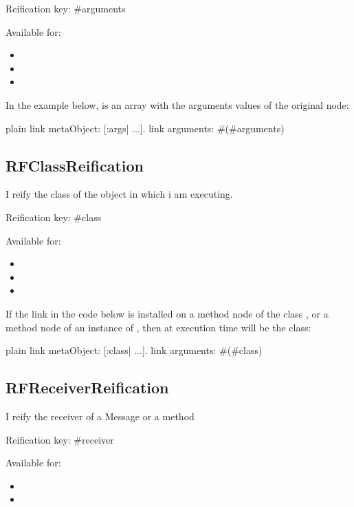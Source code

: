 \documentclass[10pt,twoside,english]{_support/latex/sbabook/sbabook}
\begin{document}
Reification key: \#arguments

Available for:

\begin{itemize}
\item {}
\item {}
\item {}
\end{itemize}

In the example below,  is an array with the arguments values of the original node:

\begin{displaycode}{plain}
link metaObject: [:args| ...].
link arguments: #(#arguments)
\end{displaycode}
\subsection{RFClassReification}
I reify the class of the object in which i am executing.

Reification key: \#class

Available for:

\begin{itemize}
\item {}
\item {}
\item {}
\end{itemize}

If the link in the code below is installed on a method node of the class , or a method node of an instance of , then at execution time  will be the  class:

\begin{displaycode}{plain}
link metaObject: [:class| ...].
link arguments: #(#class)
\end{displaycode}
\subsection{RFReceiverReification}
I reify the receiver of a Message or a method

Reification key: \#receiver

Available for:

\begin{itemize}
\item {}
\item {}
\end{itemize}
\end{document}
